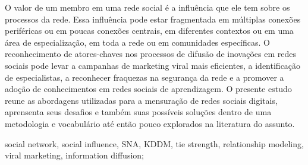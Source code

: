 O valor de um membro em uma rede social é a influência que ele tem
sobre os processos da rede. Essa influência pode estar fragmentada em
múltiplas conexões periféricas ou em poucas conexões centrais, em
diferentes contextos ou em uma área de especialização, em toda a rede
ou em comunidades específicas. O reconhecimento de atores-chaves nos
processos de difusão de inovações em redes sociais pode levar a
campanhas de marketing viral mais eficientes, a identificação de
especialistas, a reconhecer fraquezas na segurança da rede e a
promover a adoção de conhecimentos em redes sociais de aprendizagem. O
presente estudo reune as abordagens utilizadas para a mensuração de
redes sociais digitais, aprensenta seus desafios e também suas
possíveis soluções dentro de uma metodologia e vocabulário até então
pouco explorados na literatura do assunto.

\begin{keywords}
social network, social influence, SNA, KDDM, tie strength,
relationship modeling, viral marketing, information diffusion;
\end{keywords}